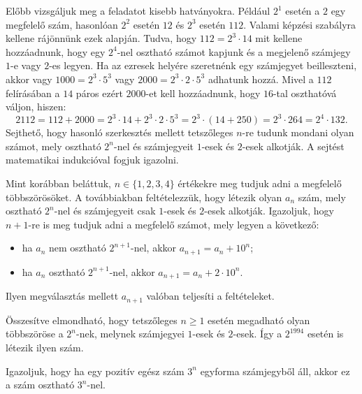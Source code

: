\begin{solution}
Előbb vizsgáljuk meg a feladatot kisebb hatványokra. Például $2^{1}$
esetén a $2$ egy megfelelő szám, hasonlóan $2^{2}$ esetén $12$
és $2^{3}$ esetén $112$. Valami képzési szabályra kellene rájönnünk
ezek alapján. Tudva, hogy $112=2^{3}\cdot14$ mit kellene hozzáadnunk,
hogy egy $2^{4}$-nel osztható számot kapjunk és a megjelenő számjegy
$1$-e vagy $2$-es legyen. Ha az ezresek helyére szeretnénk egy számjegyet
beilleszteni, akkor vagy $1000=2^{3}\cdot5^{3}$ vagy $2000=2^{3}\cdot2\cdot5^{3}$
adhatunk hozzá. Mivel a $112$ felírásában a $14$ páros ezért $2000$-et
kell hozzáadnunk, hogy $16$-tal oszthatóvá váljon, hiszen: 
\[
2112=112+2000=2^{3}\cdot14+2^{3}\cdot2\cdot5^{3}=2^{3}\cdot(14+250)=2^{3}\cdot264=2^{4}\cdot132.
\]
Sejthető, hogy hasonló szerkesztés mellett tetszőleges $n$-re tudunk
mondani olyan számot, mely osztható $2^{n}$-nel és számjegyeit $1$-esek
és $2$-esek alkotják. A sejtést matematikai indukcióval fogjuk igazolni.

Mint korábban beláttuk, $n\in\{1,2,3,4\}$ értékekre meg tudjuk adni
a megfelelő többszörösöket. A továbbiakban feltételezzük, hogy létezik
olyan $a_{n}$ szám, mely osztható $2^{n}$-nel és számjegyeit csak
$1$-esek és $2$-esek alkotják. Igazoljuk, hogy $n+1$-re is meg
tudjuk adni a megfelelő számot, mely legyen a következő: 
\begin{itemize}
\item ha $a_{n}$ nem osztható $2^{n+1}$-nel, akkor $a_{n+1}=a_{n}+10^{n}$; 
\item ha $a_{n}$ osztható $2^{n+1}$-nel, akkor $a_{n+1}=a_{n}+2\cdot10^{n}$. 
\end{itemize}
Ilyen megválasztás mellett $a_{n+1}$ valóban teljesíti a feltételeket.

Összesítve elmondható, hogy tetszőleges $n\geq1$ esetén megadható
olyan többszöröse a $2^{n}$-nek, melynek számjegyei $1$-esek és
$2$-esek. Így a $2^{1994}$ esetén is létezik ilyen szám.
\end{solution}
\begin{extraproblem}
Igazoljuk, hogy ha egy pozitív egész szám $3^{n}$ egyforma számjegyből
áll, akkor ez a szám osztható $3^{n}$-nel.\\
 
\end{extraproblem}

